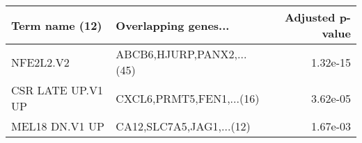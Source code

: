 \begin{tabular}{llr}
\toprule
   Term name (12) &      Overlapping genes... &  Adjusted p-value \\
\midrule
        NFE2L2.V2 & ABCB6,HJURP,PANX2,...(45) &          1.32e-15 \\
CSR LATE UP.V1 UP &  CXCL6,PRMT5,FEN1,...(16) &          3.62e-05 \\
   MEL18 DN.V1 UP &  CA12,SLC7A5,JAG1,...(12) &          1.67e-03 \\
\bottomrule
\end{tabular}
